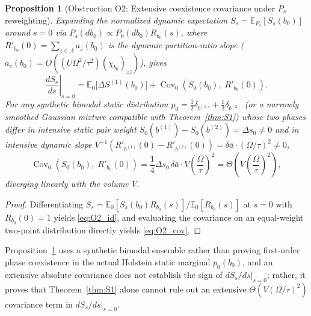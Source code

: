 \documentclass[11pt]{article}
\newtheorem{proposition}[theorem]{Proposition}
\theoremstyle{definition}
\theoremstyle{remark}
\DeclareMathOperator{\Cov}{Cov}
\newcommand{\E}{\mathbb{E}}
\begin{document}
\begin{proposition}[Obstruction O2: Extensive coexistence covariance under $P_s$ reweighting]
\label{prop:O2}
Expanding the normalized dynamic expectation $S_s = \E_{P_s}[S_s(b_0)]$ around $s = 0$ via $P_s(db_0) \propto P_0(db_0) R_{b_0}(s)$, where $R'_{b_0}(0) = \sum_{z\in\Lambda} a_z(b_0)$ is the dynamic partition-ratio slope ($a_z(b_0) = O((U\Omega^2/\tau^2)(\chi_{b_0})_{zz})$), gives
\begin{equation}
\left.\frac{d S_s}{ds}\right|_{s=0} = \E_0\bigl[\Delta S^{(1)}(b_0)\bigr] + \Cov_0\!\left(S_0(b_0),\; R'_{b_0}(0)\right).
\label{eq:O2_id}
\end{equation}
For any synthetic bimodal static distribution $p_0 = \frac{1}{2}\delta_{b^{(1)}} + \frac{1}{2}\delta_{b^{(2)}}$ (or a narrowly smoothed Gaussian mixture compatible with Theorem~\ref{thm:S1}) whose two phases differ in intensive static pair weight $S_0(b^{(1)}) - S_0(b^{(2)}) = \Delta s_0 \neq 0$ and in intensive dynamic slope $V^{-1}(R'_{b^{(1)}}(0) - R'_{b^{(2)}}(0)) = \delta\bar{a} \cdot (\Omega/\tau)^2 \neq 0$,
\begin{equation}
\Cov_0\!\left(S_0(b_0),\; R'_{b_0}(0)\right) = \frac{1}{4}\Delta s_0\,\delta\bar{a}\cdot V\left(\frac{\Omega}{\tau}\right)^2 = \Theta\!\left(V\left(\frac{\Omega}{\tau}\right)^2\right),
\label{eq:O2_cov}
\end{equation}
diverging linearly with the volume $V$.
\end{proposition}

\begin{proof}
Differentiating $S_s = \E_0[S_s(b_0) R_{b_0}(s)] / \E_0[R_{b_0}(s)]$ at $s=0$ with $R_{b_0}(0) = 1$ yields \eqref{eq:O2_id}, and evaluating the covariance on an equal-weight two-point distribution directly yields \eqref{eq:O2_cov}.
\end{proof}

Proposition~\ref{prop:O2} uses a synthetic bimodal ensemble rather than proving first-order phase coexistence in the actual Holstein static marginal $p_0(b_0)$, and an extensive absolute covariance does not establish the sign of $dS_s/ds|_{s=0}$; rather, it proves that Theorem~\ref{thm:S1} alone cannot rule out an extensive $\Theta(V(\Omega/\tau)^2)$ covariance term in $dS_s/ds|_{s=0}$.
\end{document}
